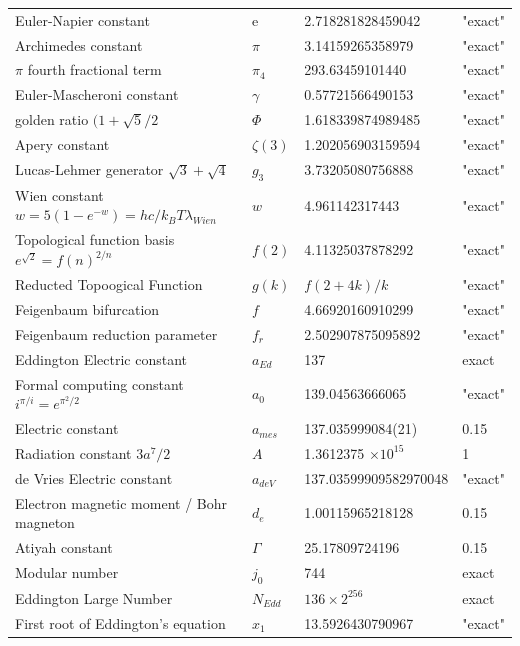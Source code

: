 \documentclass[a4paper,9pt]{article}
\begin{document}
\begin{appendix}
\begin{table}
\begin{tabular}{llll}
    Euler-Napier constant  & e    & 2.718281828459042 & "exact" \\    
    Archimedes constant & $\pi$    & 3.14159265358979 & "exact" \\    
    $\pi$ fourth fractional term & $\pi_4$    & 293.63459101440 & "exact" \\ 
    Euler-Mascheroni constant & $\gamma$    & 0.57721566490153 & "exact" \\    
    golden ratio $(1+\sqrt5/2$ & $\Phi $    & 1.618339874989485 & "exact" \\     
    Apery constant & $\zeta(3)$    & 1.202056903159594 & "exact" \\    
    Lucas-Lehmer generator $\sqrt3 + \sqrt4 $  & $g_3$    & 3.73205080756888 & "exact" \\    
    Wien constant $w = 5(1-e^{-w})= hc/k_BT\lambda_{Wien}$  & $w$    & 4.961142317443 & "exact" \\    
    Topological function basis $e^{\sqrt2} = f(n)^{2/n}$ & $f(2)  $    & 4.11325037878292 & "exact" \\    
    Reducted Topoogical Function & $g(k) $ &  $ f(2 + 4k)/k$  & "exact" \\  
    Feigenbaum bifurcation & $f$    & 4.66920160910299 & "exact" \\     
    Feigenbaum reduction parameter & $f_r$    & 2.502907875095892 & "exact" \\    
    Eddington Electric constant  & $a_{Ed}$    & 137 & exact \\    
    Formal computing constant $i^{\pi /i} = e^{\pi ^2/2}$ & $a_0$ & 139.04563666065   & "exact" \\    
    Electric constant  & $a_{mes}$    & 137.035999084(21) & 0.15 \\    
    Radiation constant $3a^7/2$ & $A$    & 1.3612375 $\times 10^{15}$& 1 \\    
    de Vries Electric constant  & $a_{deV} $   & 137.03599909582970048 & "exact" \\    
    Electron magnetic moment / Bohr magneton  & $d_e$    & 1.00115965218128 & 0.15 \\    
    Atiyah constant & $\Gamma$    & 25.17809724196  & 0.15 \\    
    Modular number & $j_0$    & 744  & exact \\ 
    Eddington Large Number & $N_{Edd}$    & $136 \times 2^{256}$  & exact \\     
    First root of Eddington's equation  & $x_1$    & 13.5926430790967   & "exact"\\     

\end{tabular}
\end{table}
\end{appendix}
\end{document}
